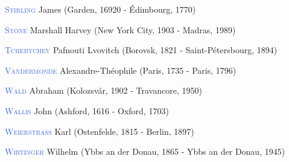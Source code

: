 \item \textcolor{RoyalBlue}{\textsc{Stirling}} James  (Garden, 16920 - Édimbourg, 1770)
\item \textcolor{RoyalBlue}{\textsc{Stone}} Marshall Harvey (New York City, 1903 - Madras, 1989)
\item \textcolor{RoyalBlue}{\textsc{Tchebychev}} Pafnouti Lvovitch (Borovsk, 1821 - Saint-Pétersbourg, 1894)
\item \textcolor{RoyalBlue}{\textsc{Vandermonde}} Alexandre-Théophile (Paris, 1735 - Paris, 1796)
\item \textcolor{RoyalBlue}{\textsc{Wald}} Abraham (Kolozsvár, 1902 - Travancore, 1950)
\item \textcolor{RoyalBlue}{\textsc{Wallis}} John  (Ashford, 1616 - Oxford, 1703)
\item \textcolor{RoyalBlue}{\textsc{Weierstrass}} Karl (Ostenfelde, 1815 - Berlin, 1897)
\item \textcolor{RoyalBlue}{\textsc{Wirtinger}} Wilhelm (Ybbs an der Donau, 1865 - Ybbs an der Donau, 1945)

